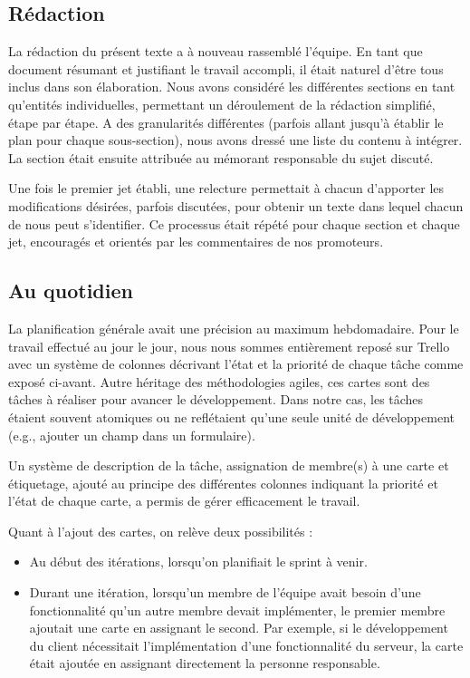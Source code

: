 \documentclass{EPL-master-thesis-covers-FR}
\begin{document}
			\subsection*{Rédaction}

				La rédaction du présent texte a à nouveau rassemblé l'équipe. En tant que document résumant et justifiant le travail accompli, il était naturel d'être tous inclus dans son élaboration. Nous avons considéré les différentes sections en tant qu'entités individuelles, permettant un déroulement de la rédaction simplifié, étape par étape. A des granularités différentes (parfois allant jusqu'à établir le plan pour chaque sous-section), nous avons dressé une liste du contenu à intégrer. La section était ensuite attribuée au mémorant responsable du sujet discuté.

				Une fois le premier jet établi, une relecture permettait à chacun d'apporter les modifications désirées, parfois discutées, pour obtenir un texte dans lequel chacun de nous peut s'identifier. Ce processus était répété pour chaque section et chaque jet, encouragés et orientés par les commentaires de nos promoteurs.

			\subsection*{Au quotidien}

				La planification générale avait une précision au maximum hebdomadaire. Pour le travail effectué au jour le jour, nous nous sommes entièrement reposé sur Trello avec un système de colonnes décrivant l'état et la priorité de chaque tâche comme exposé ci-avant. Autre héritage des méthodologies agiles, ces cartes sont des tâches à réaliser pour avancer le développement. Dans notre cas, les tâches étaient souvent atomiques ou ne reflétaient qu'une seule unité de développement (e.g., ajouter un champ dans un formulaire).

				Un système de description de la tâche, assignation de membre(s) à une carte et étiquetage, ajouté au principe des différentes colonnes indiquant la priorité et l'état de chaque carte, a permis de gérer efficacement le travail.

				Quant à l'ajout des cartes, on relève deux possibilités :
				\begin{itemize}
					\item Au début des itérations, lorsqu'on planifiait le sprint à venir.
					\item Durant une itération, lorsqu'un membre de l'équipe avait besoin d'une fonctionnalité qu'un autre membre devait implémenter, le premier membre ajoutait une carte en assignant le second. Par exemple, si le développement du client nécessitait l'implémentation d'une fonctionnalité du serveur, la carte était ajoutée en assignant directement la personne responsable.
				\end{itemize}
\end{document}
